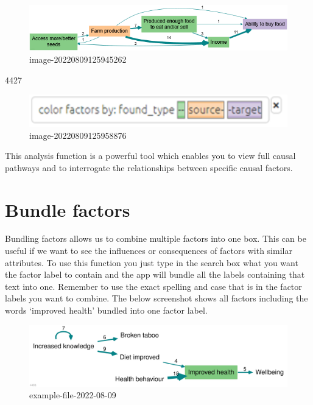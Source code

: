 \documentclass[
]{book}
\begin{document}
\begin{figure}
\centering
\includegraphics[width=6.77083in,height=\textheight]{_assets/image-20220809125945262.png}
\caption{image-20220809125945262}
\end{figure}

4427

\begin{figure}
\centering
\includegraphics[width=6.77083in,height=\textheight]{_assets/image-20220809125958876.png}
\caption{image-20220809125958876}
\end{figure}

This analysis function is a powerful tool which enables you to view full causal pathways and to interrogate the relationships between specific causal factors.

\hypertarget{bundlefactors}{%
\section{Bundle factors}\label{bundlefactors}}

Bundling factors allows us to combine multiple factors into one box. This can be useful if we want to see the influences or consequences of factors with similar attributes. To use this function you just type in the search box what you want the factor label to contain and the app will bundle all the labels containing that text into one. Remember to use the exact spelling and case that is in the factor labels you want to combine. The below screenshot shows all factors including the words `improved health' bundled into one factor label.

\begin{figure}
\centering
\includegraphics[width=6.77083in,height=\textheight]{_assets/example-file-2022-08-09.svg}
\caption{example-file-2022-08-09}
\end{figure}
\end{document}
